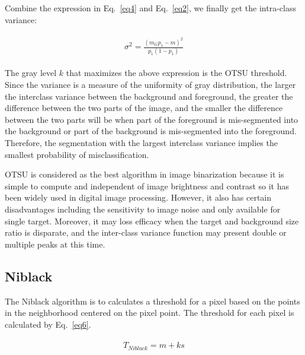 \documentclass[hyperref]{article}
\theoremstyle{nonumberplain}
\begin{document}
	Combine the expression in Eq.~\ref{eq4} and Eq.~\ref{eq2}, we finally get the intra-class variance:
	
	\begin{equation}
	\begin{split}
	\begin{aligned}
	\sigma ^{2}=\frac{(m_{G}p_{1}-m)^{2}}{p_{1}(1-p_{1})}
	\end{aligned}
	\end{split}
	\label{eq5}
	\end{equation}
	
	The gray level $k$ that maximizes the above expression is the OTSU threshold. Since the variance is a measure of the uniformity of gray distribution, the larger the interclass variance between the background and foreground, the greater the difference between the two parts of the image, and the smaller the difference between the two parts will be when part of the foreground is mis-segmented into the background or part of the background is mis-segmented into the foreground. Therefore, the segmentation with the largest interclass variance implies the smallest probability of misclassification.
	
	OTSU is considered as the best algorithm in image binarization because it is simple to compute and independent of image brightness and contrast so it has been widely used in digital image processing. However, it also has certain disadvantages including the sensitivity to image noise and only available for single target. Moreover, it may loss efficacy when the target and background size ratio is disparate, and the inter-class variance function may present double or multiple peaks at this time.
	
	\subsection{Niblack}
	
	\hspace{1.0em}
	The Niblack algorithm is to calculates a threshold for a pixel based on the points in the neighborhood centered on the pixel point. The threshold for each pixel is calculated by Eq.~\ref{eq6}.
	
	\begin{equation}
	\begin{split}
	\begin{aligned}
	T_{Niblack}=m+ks
	\end{aligned}
	\end{split}
	\label{eq6}
	\end{equation}
	
\end{document}
